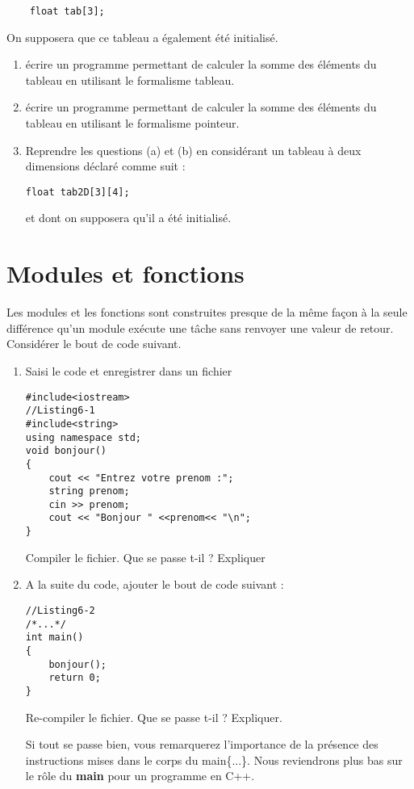 \documentclass[a4paper, oneside,11pt]{book}
\begin{document}
\begin{enumerate}
\begin{verbatim}
    float tab[3];
\end{verbatim}

On supposera que ce tableau a \'egalement \'et\'e initialis\'e.
\begin{enumerate}
\item \'ecrire un programme permettant de calculer la somme des \'el\'ements du tableau en utilisant
le formalisme tableau.
\item \'ecrire un programme permettant de calculer la somme des \'el\'ements du 
tableau en utilisant le formalisme pointeur.
\item Reprendre les questions (a) et (b) en consid\'erant un tableau 
\`a deux dimensions d\'eclar\'e comme
suit :
\begin{verbatim}
float tab2D[3][4];
\end{verbatim}
et dont on supposera qu'il a \'et\'e initialis\'e.
\end{enumerate}




\end{enumerate}


\chapter{Modules et fonctions}


\pagestyle{fancy}
\renewcommand{\chaptermark}[1]{\markboth{#1}{}}
 \rhead{\thepage}
Les modules et les fonctions sont construites presque de la m\^eme fa\c{c}on \`a la seule diff\'erence qu'un module ex\'ecute une t\^ache sans renvoyer une valeur de retour.
Consid\'erer le bout de code suivant.

\begin{enumerate}
\item Saisi le code et enregistrer dans un fichier
\begin{lstlisting}
#include<iostream>
//Listing6-1
#include<string>
using namespace std;
void bonjour() 
{
    cout << "Entrez votre prenom :";
    string prenom;
    cin >> prenom;
    cout << "Bonjour " <<prenom<< "\n";
}
\end{lstlisting}

Compiler le fichier. Que se passe t-il ? Expliquer
\item A la suite du code, ajouter le bout de code suivant :

\begin{lstlisting}
//Listing6-2
/*...*/
int main() 
{
    bonjour();
    return 0;
}
\end{lstlisting}
Re-compiler le fichier. Que se passe t-il ? Expliquer.

Si tout se passe bien, vous remarquerez l'importance de la pr\'esence des instructions mises dans le corps du main\{...\}. Nous reviendrons plus bas sur le r\^ole du \textbf{main}
 pour un programme en C++.
\end{enumerate}
\end{document}
